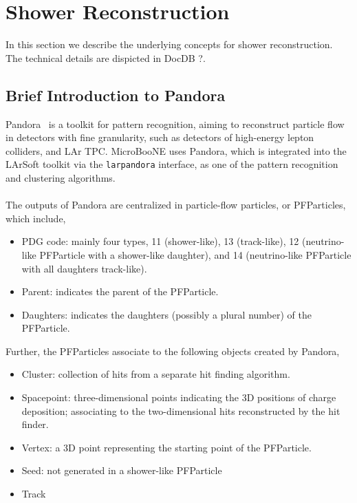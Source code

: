 \section{Shower Reconstruction}
\label{sec:reco}

In this section we describe the underlying concepts for shower reconstruction.
The technical details are dispicted in DocDB ?.

\subsection{Brief Introduction to Pandora}
\label{sec:pandora}

Pandora~\cite{DocDB5828} is a toolkit for pattern recognition, aiming to 
reconstruct particle flow in detectors with fine granularity, such as
detectors of high-energy lepton colliders, and LAr TPC.
MicroBooNE uses Pandora, which is integrated into the LArSoft toolkit
via the \texttt{larpandora} interface,
as one of the pattern recognition and clustering algorithms. \\
\\
The outputs of Pandora are centralized in particle-flow particles, 
or PFParticles, which include,
\begin{itemize}
\item PDG code: mainly four types, 11 (shower-like),
      13 (track-like), 12 (neutrino-like PFParticle with a shower-like
      daughter), and 14 (neutrino-like PFParticle with all daughters
      track-like).
\item Parent: indicates the parent of the PFParticle.
\item Daughters: indicates the daughters (possibly a plural number) of
      the PFParticle.
\end{itemize}
Further, the PFParticles associate to the following objects created
by Pandora,
\begin{itemize}
\item Cluster: collection of hits from a separate hit finding algorithm.
\item Spacepoint: three-dimensional points indicating the 3D positions
      of charge deposition; associating to the two-dimensional hits
      reconstructed by the hit finder.
\item Vertex: a 3D point representing the starting point of the PFParticle.
\item Seed: not generated in a shower-like PFParticle
\item Track
\end{itemize}

